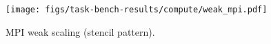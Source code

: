 \begin{figure}[t]
\centering
\texttt{[image: figs/task-bench-results/compute/weak\_mpi.pdf]}
\caption{MPI weak scaling (stencil pattern).\label{fig:weak-scaling-mpi}}
\end{figure}
